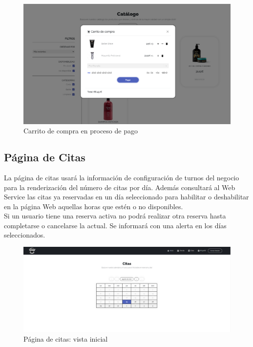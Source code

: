 \begin{figure}[H]
  \includegraphics[scale=0.35]{images/front-end-payment.png}
  \caption{Carrito de compra en proceso de pago}
  \label{}
\end{figure}

\subsection{Página de Citas}

La página de citas usará la información de configuración de turnos del negocio para la renderización del número de citas por día. Además consultará al Web Service las citas ya reservadas en un día seleccionado para habilitar o deshabilitar en la página Web aquellas horas que estén o no disponibles.\\
Si un usuario tiene una reserva activa no podrá realizar otra reserva hasta completarse o cancelarse la actual. Se informará con una alerta en los días seleccionados.

\begin{figure}[H]
  \centering
  \includegraphics[scale=0.2]{images/front-end-appointment-1.png}
  \caption{Página de citas: vista inicial}
  \label{}
\end{figure}

